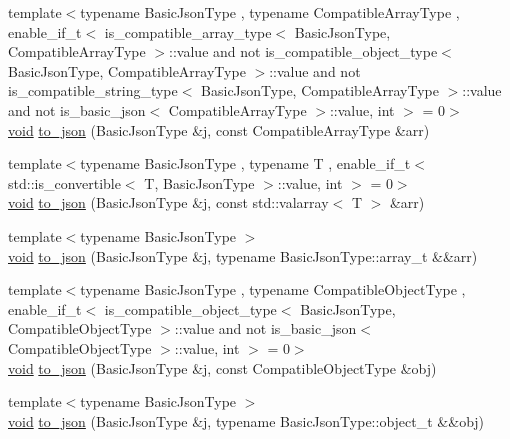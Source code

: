 \begin{DoxyCompactItemize}
\item 
{\footnotesize template$<$typename Basic\+Json\+Type , typename Compatible\+Array\+Type , enable\+\_\+if\+\_\+t$<$ is\+\_\+compatible\+\_\+array\+\_\+type$<$ Basic\+Json\+Type, Compatible\+Array\+Type $>$\+::value and not is\+\_\+compatible\+\_\+object\+\_\+type$<$ Basic\+Json\+Type, Compatible\+Array\+Type $>$\+::value and not is\+\_\+compatible\+\_\+string\+\_\+type$<$ Basic\+Json\+Type, Compatible\+Array\+Type $>$\+::value and not is\+\_\+basic\+\_\+json$<$ Compatible\+Array\+Type $>$\+::value, int $>$  = 0$>$ }\\\mbox{\hyperlink{namespacenlohmann_1_1detail_a59fca69799f6b9e366710cb9043aa77d}{void}} \mbox{\hyperlink{namespacenlohmann_1_1detail_a3afebc132c5ff83f9cd160e52030fdfd}{to\+\_\+json}} (Basic\+Json\+Type \&j, const Compatible\+Array\+Type \&arr)
\item 
{\footnotesize template$<$typename Basic\+Json\+Type , typename T , enable\+\_\+if\+\_\+t$<$ std\+::is\+\_\+convertible$<$ T, Basic\+Json\+Type $>$\+::value, int $>$  = 0$>$ }\\\mbox{\hyperlink{namespacenlohmann_1_1detail_a59fca69799f6b9e366710cb9043aa77d}{void}} \mbox{\hyperlink{namespacenlohmann_1_1detail_a7f7c7b9760161b774cdc0b4b838fae64}{to\+\_\+json}} (Basic\+Json\+Type \&j, const std\+::valarray$<$ T $>$ \&arr)
\item 
{\footnotesize template$<$typename Basic\+Json\+Type $>$ }\\\mbox{\hyperlink{namespacenlohmann_1_1detail_a59fca69799f6b9e366710cb9043aa77d}{void}} \mbox{\hyperlink{namespacenlohmann_1_1detail_aa0fd1b5788e9ba37e31da43dda738cb5}{to\+\_\+json}} (Basic\+Json\+Type \&j, typename Basic\+Json\+Type\+::array\+\_\+t \&\&arr)
\item 
{\footnotesize template$<$typename Basic\+Json\+Type , typename Compatible\+Object\+Type , enable\+\_\+if\+\_\+t$<$ is\+\_\+compatible\+\_\+object\+\_\+type$<$ Basic\+Json\+Type, Compatible\+Object\+Type $>$\+::value and not is\+\_\+basic\+\_\+json$<$ Compatible\+Object\+Type $>$\+::value, int $>$  = 0$>$ }\\\mbox{\hyperlink{namespacenlohmann_1_1detail_a59fca69799f6b9e366710cb9043aa77d}{void}} \mbox{\hyperlink{namespacenlohmann_1_1detail_a24c9c12f3839c94e09532f08de85e949}{to\+\_\+json}} (Basic\+Json\+Type \&j, const Compatible\+Object\+Type \&obj)
\item 
{\footnotesize template$<$typename Basic\+Json\+Type $>$ }\\\mbox{\hyperlink{namespacenlohmann_1_1detail_a59fca69799f6b9e366710cb9043aa77d}{void}} \mbox{\hyperlink{namespacenlohmann_1_1detail_ac9f7a5542851c61d93740148eaec509f}{to\+\_\+json}} (Basic\+Json\+Type \&j, typename Basic\+Json\+Type\+::object\+\_\+t \&\&obj)

\end{DoxyCompactItemize}
